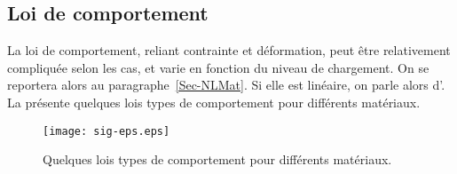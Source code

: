 \medskip
\subsection{Loi de comportement}\label{Sec-Loi}
La loi de comportement, reliant contrainte et déformation, peut être relativement compliquée 
selon les cas, et varie en fonction du niveau de chargement. On se reportera alors au paragraphe~\ref{Sec-NLMat}.
Si elle est linéaire, on parle alors d'.
La  présente quelques lois types de comportement pour différents matériaux.
\begin{figure}[ht]
  \centerline{\texttt{[image: sig-eps.eps]}}
  \caption{\label{Fig-sig-eps} Quelques lois types de comportement pour différents matériaux.}
\end{figure}

